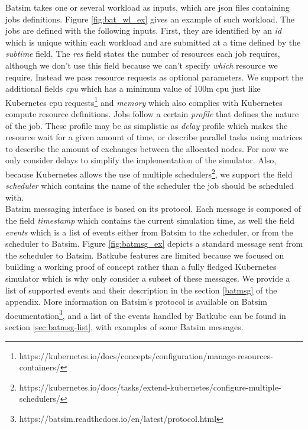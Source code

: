 Batsim takes one or several workload as inputs, which are json files containing
jobs definitions. Figure \ref{fig:bat_wl_ex} gives an example of such workload.
The jobs are defined with the following inputs.  First, they are identified by
an \textit{id} which is unique within each workload and are submitted at a time
defined by the \textit{subtime} field. The \textit{res} field states the number
of resources each job requires, although we don't use this field because we
can't specify \textit{which} resource we require. Instead we pass resource
requests as optional parameters. We support the additional fields \textit{cpu}
which has a minimum value of 100m cpu just like Kubernetes cpu
requests\footnote{https://kubernetes.io/docs/concepts/configuration/manage-resources-containers/}
and \textit{memory} which also complies with Kubernetes compute resource
definitions.  Jobs follow a certain \textit{profile} that defines the nature of
the job.  These profile may be as simplistic as \textit{delay} profile which
makes the resource wait for a given amount of time, or describe parallel tasks
using matrices to describe the amount of exchanges between the allocated nodes.
For now we only consider delays to simplify the implementation of the
simulator. Also, because Kubernetes allows the use of multiple
schedulers\footnote{https://kubernetes.io/docs/tasks/extend-kubernetes/configure-multiple-schedulers/},
we support the field \textit{scheduler} which contains the name of the
scheduler the job should be scheduled with.\\

Batsim messaging interface is based on its protocol. Each message is composed
of the field \textit{timestamp} which contains the current simulation time, as
well the field \textit{events} which is a list of events either from Batsim to
the scheduler, or from the scheduler to Batsim. Figure \ref{fig:batmsg_ex}
depicts a standard message sent from the scheduler to Batsim.  Batkube features
are limited because we focused on building a working proof of concept rather
than a fully fledged Kubernetes simulator which is why only consider a subset
of these messages. We provide a list of supported events and their description
in the section \ref{batmsg} of the appendix. More information on Batsim's
protocol is available on Batsim
documentation\footnote{https://batsim.readthedocs.io/en/latest/protocol.html},
and a list of the events handled by Batkube can be found in section
\ref{sec:batmsg-list}, with examples of some Batsim messages.

